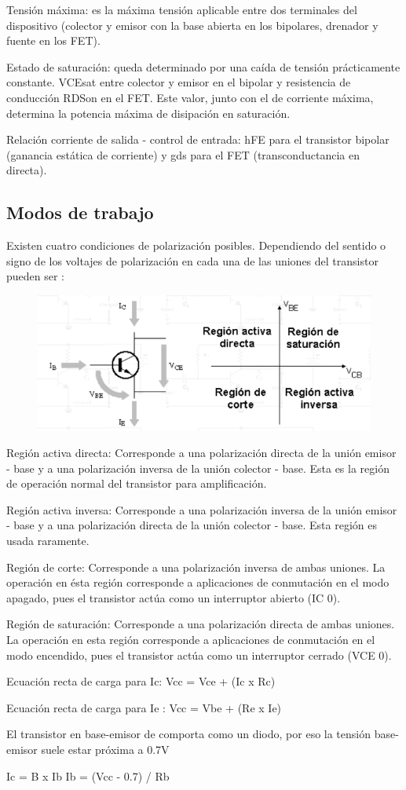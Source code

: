 \documentclass[12pt,a4paper]{article}
\begin{document}
Tensión máxima: es la máxima tensión aplicable entre dos terminales del dispositivo (colector y emisor con la base abierta en los bipolares, drenador y fuente en los FET).

Estado de saturación: queda determinado por una caída de tensión prácticamente constante. VCEsat entre colector y emisor en el bipolar y resistencia de conducción RDSon en el FET. Este valor, junto con el de corriente máxima, determina la potencia máxima de disipación en saturación.

Relación corriente de salida - control de entrada: hFE para el transistor bipolar (ganancia estática de corriente) y gds para el FET (transconductancia en directa).
\subsection{Modos de trabajo}
Existen cuatro condiciones de polarización posibles. Dependiendo del sentido o signo de los voltajes de polarización en cada una de las uniones del transistor pueden ser :
\begin{figure}[h!]
\centering
\includegraphics[scale=1]{Modos de trabajo.png}  
\end{figure}
Región activa directa: Corresponde a una polarización directa de la unión emisor - base y a una polarización inversa de la unión colector - base. Esta es la región de operación normal del transistor para amplificación.
 

Región activa inversa: Corresponde a una polarización inversa de la unión emisor - base y a una polarización directa de la unión colector - base. Esta región es usada raramente.
 

Región de corte: Corresponde a una polarización inversa de ambas uniones. La operación en ésta región corresponde a aplicaciones de conmutación en el modo apagado, pues el transistor actúa como un interruptor abierto (IC 0).
 

Región de saturación: Corresponde a una polarización directa de ambas uniones. La operación en esta región corresponde a aplicaciones de conmutación en el modo encendido, pues el transistor actúa como un interruptor cerrado (VCE 0).

Ecuación recta de carga para Ic: Vcc = Vce + (Ic x Rc)

Ecuación recta de carga para Ie  : Vcc = Vbe + (Re x Ie)

El transistor en base-emisor de comporta como un diodo, por eso la tensión base-emisor suele estar próxima a 0.7V

Ic = B x Ib
Ib = (Vcc - 0.7) / Rb
\end{document}
